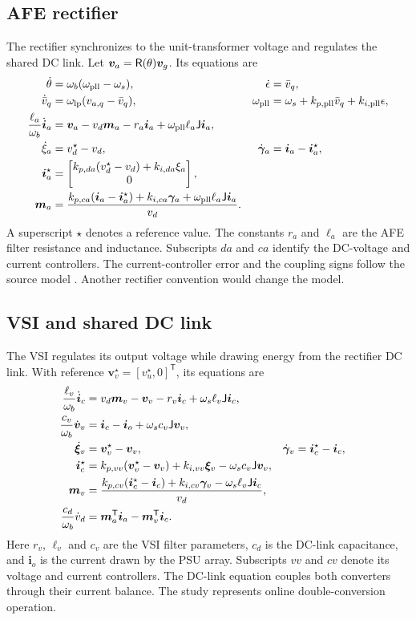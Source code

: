 \subsection{AFE rectifier}
The rectifier synchronizes to the unit-transformer voltage and regulates the shared DC link.
Let $\bm v_a=\mathsf R(\theta)\bm v_g$.
Its equations are
\begin{align}
\dot\theta&=\omega_b(\omega_{\rm pll}-\omega_s), & \dot\epsilon&=\bar v_q,\\
\dot{\bar v}_q&=\omega_{\rm lp}(v_{a,q}-\bar v_q), &
\omega_{\rm pll}&=\omega_s+k_{p,\rm pll}\bar v_q+k_{i,\rm pll}\epsilon,\\
\frac{\ell_a}{\omega_b}\dot{\bm i}_a&=\bm v_a-v_d\bm m_a-r_a\bm i_a+\omega_{\rm pll}\ell_a\mathsf J\bm i_a,\\
\dot\xi_a&=v_d^\star-v_d, & \dot{\bm\gamma}_a&=\bm i_a-\bm i_a^\star,\\
\bm i_a^\star&=\begin{bmatrix}k_{p,da}(v_d^\star-v_d)+k_{i,da}\xi_a\\0\end{bmatrix},\\
\bm m_a&=\frac{k_{p,ca}(\bm i_a-\bm i_a^\star)+k_{i,ca}\bm\gamma_a+\omega_{\rm pll}\ell_a\mathsf J\bm i_a}{v_d}.
\end{align}
A superscript $\star$ denotes a reference value.
The constants $r_a$ and $\ell_a$ are the AFE filter resistance and inductance.
Subscripts $da$ and $ca$ identify the DC-voltage and current controllers.
The current-controller error and the coupling signs follow the source model \cite{zhao2026dynamic}.
Another rectifier convention would change the model.

\subsection{VSI and shared DC link}
The VSI regulates its output voltage while drawing energy from the rectifier DC link.
With reference $\bm v_v^\star=[v_u^\star,0]^{\mathsf T}$, its equations are
\begin{align}
\frac{\ell_v}{\omega_b}\dot{\bm i}_c&=v_d\bm m_v-\bm v_v-r_v\bm i_c+\omega_s\ell_v\mathsf J\bm i_c,\label{eq:vsi-current}\\
\frac{c_v}{\omega_b}\dot{\bm v}_v&=\bm i_c-\bm i_o+\omega_s c_v\mathsf J\bm v_v,\\
\dot{\bm\xi}_v&=\bm v_v^\star-\bm v_v, & \dot{\bm\gamma}_v&=\bm i_c^\star-\bm i_c,\\
\bm i_c^\star&=k_{p,vv}(\bm v_v^\star-\bm v_v)+k_{i,vv}\bm\xi_v-\omega_s c_v\mathsf J\bm v_v,\\
\bm m_v&=\frac{k_{p,cv}(\bm i_c^\star-\bm i_c)+k_{i,cv}\bm\gamma_v-\omega_s\ell_v\mathsf J\bm i_c}{v_d},\label{eq:vsi-modulation}\\
\frac{c_d}{\omega_b}\dot v_d&=\bm m_a^{\mathsf T}\bm i_a-\bm m_v^{\mathsf T}\bm i_c.
\end{align}
Here $r_v$, $\ell_v$ and $c_v$ are the VSI filter parameters, $c_d$ is the DC-link capacitance, and $\bm i_o$ is the current drawn by the PSU array.
Subscripts $vv$ and $cv$ denote its voltage and current controllers.
The DC-link equation couples both converters through their current balance.
The study represents online double-conversion operation.

